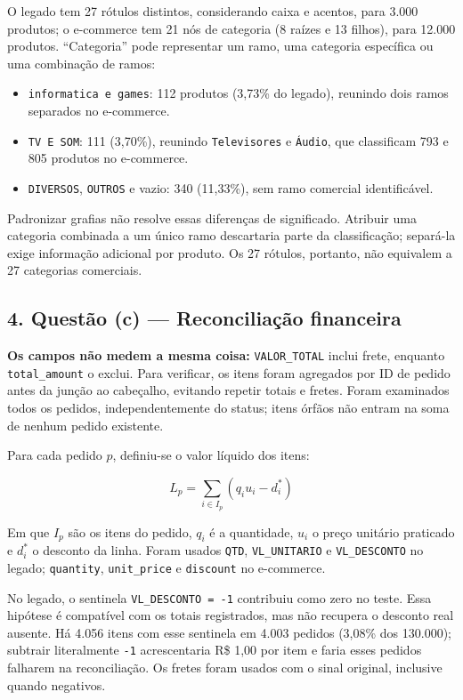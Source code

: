 \documentclass[11pt,a4paper]{article}
\providecommand{\tightlist}{\setlength{\itemsep}{0pt}\setlength{\parskip}{0pt}}
\begin{document}
O legado tem 27 rótulos distintos, considerando caixa e acentos, para
3.000 produtos; o e-commerce tem 21 nós de categoria (8 raízes e 13
filhos), para 12.000 produtos. ``Categoria'' pode representar um ramo,
uma categoria específica ou uma combinação de ramos:

\begin{itemize}
\tightlist
\item
  \texttt{informatica\ e\ games}: 112 produtos (3,73\% do legado),
  reunindo dois ramos separados no e-commerce.
\item
  \texttt{TV\ E\ SOM}: 111 (3,70\%), reunindo \texttt{Televisores} e
  \texttt{Áudio}, que classificam 793 e 805 produtos no e-commerce.
\item
  \texttt{DIVERSOS}, \texttt{OUTROS} e vazio: 340 (11,33\%), sem ramo
  comercial identificável.
\end{itemize}

Padronizar grafias não resolve essas diferenças de significado. Atribuir
uma categoria combinada a um único ramo descartaria parte da
classificação; separá-la exige informação adicional por produto. Os 27
rótulos, portanto, não equivalem a 27 categorias comerciais.

\subsection{4. Questão (c) --- Reconciliação
financeira}\label{questuxe3o-c-reconciliauxe7uxe3o-financeira}

\textbf{Os campos não medem a mesma coisa:} \texttt{VALOR\_TOTAL} inclui
frete, enquanto \texttt{total\_amount} o exclui. Para verificar, os
itens foram agregados por ID de pedido antes da junção ao cabeçalho,
evitando repetir totais e fretes. Foram examinados todos os pedidos,
independentemente do status; itens órfãos não entram na soma de nenhum
pedido existente.

Para cada pedido \(p\), definiu-se o valor líquido dos itens:

\[L_p = \sum_{i \in I_p} (q_i u_i - d_i^*)\]

Em que \(I_p\) são os itens do pedido, \(q_i\) é a quantidade, \(u_i\) o
preço unitário praticado e \(d_i^*\) o desconto da linha. Foram usados
\texttt{QTD}, \texttt{VL\_UNITARIO} e \texttt{VL\_DESCONTO} no legado;
\texttt{quantity}, \texttt{unit\_price} e \texttt{discount} no
e-commerce.

No legado, o sentinela \texttt{VL\_DESCONTO\ =\ -1} contribuiu como zero
no teste. Essa hipótese é compatível com os totais registrados, mas não
recupera o desconto real ausente. Há 4.056 itens com esse sentinela em
4.003 pedidos (3,08\% dos 130.000); subtrair literalmente \texttt{-1}
acrescentaria R\$ 1,00 por item e faria esses pedidos falharem na
reconciliação. Os fretes foram usados com o sinal original, inclusive
quando negativos.
\end{document}

